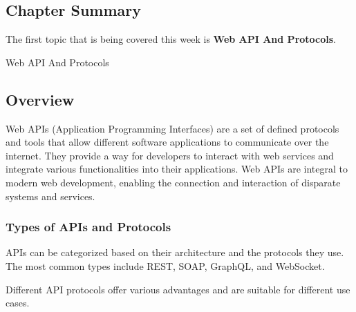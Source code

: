 \subsection{Chapter Summary}

The first topic that is being covered this week is \textbf{Web API And Protocols}.

\begin{notes}{Web API And Protocols}
    \subsection*{Overview}

    Web APIs (Application Programming Interfaces) are a set of defined protocols and tools that allow different software applications to communicate over the internet. They provide a way for developers 
    to interact with web services and integrate various functionalities into their applications. Web APIs are integral to modern web development, enabling the connection and interaction of disparate 
    systems and services.
    
    \subsubsection*{Types of APIs and Protocols}
    
    APIs can be categorized based on their architecture and the protocols they use. The most common types include REST, SOAP, GraphQL, and WebSocket.
    
    \begin{highlight}
    
        Different API protocols offer various advantages and are suitable for different use cases.
        

\end{highlight}
\end{notes}
